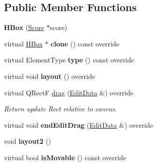 \subsection*{Public Member Functions}
\begin{DoxyCompactItemize}
\item 
\mbox{\label{class_ms_1_1_h_box_a45823710fc33864538ced27c8b7d3c2d}} 
{\bfseries H\+Box} (\hyperlink{class_ms_1_1_score}{Score} $\ast$score)
\item 
\mbox{\label{class_ms_1_1_h_box_a2086f500fd3457964a4052b021227843}} 
virtual \hyperlink{class_ms_1_1_h_box}{H\+Box} $\ast$ {\bfseries clone} () const override
\item 
\mbox{\label{class_ms_1_1_h_box_aa73a1351834e1098b45c490d42829ab8}} 
virtual Element\+Type {\bfseries type} () const override
\item 
\mbox{\label{class_ms_1_1_h_box_abedf89e4cec8eba7dd591d25b7d0d637}} 
virtual void {\bfseries layout} () override
\item 
\mbox{\label{class_ms_1_1_h_box_aa719204c2fe3916ae8d653dcae8e43e1}} 
virtual Q\+RectF \hyperlink{class_ms_1_1_h_box_aa719204c2fe3916ae8d653dcae8e43e1}{drag} (\hyperlink{class_ms_1_1_edit_data}{Edit\+Data} \&) override
\begin{DoxyCompactList}\small\item\em Return update Rect relative to canvas. \end{DoxyCompactList}\item 
\mbox{\label{class_ms_1_1_h_box_a3f6eb1305228060b36b96e94f7f84789}} 
virtual void {\bfseries end\+Edit\+Drag} (\hyperlink{class_ms_1_1_edit_data}{Edit\+Data} \&) override
\item 
\mbox{\label{class_ms_1_1_h_box_a98195c77eee625704b32ea20e1da1db0}} 
void {\bfseries layout2} ()
\item 
\mbox{\label{class_ms_1_1_h_box_a2708a9725d07ec2536b5c3e2d51ef67e}} 
virtual bool {\bfseries is\+Movable} () const override
\item 
\mbox{\label{class_ms_1_1_h_box_aa58eac681cbad5e274b18f9428e31b80}} 

\end{DoxyCompactItemize}
